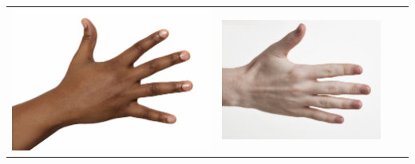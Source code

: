 \begin{longtable}{|N||c|c|c|}
\begin{minipage}{.29\textwidth}
    \includegraphics[width=\textwidth,height=\textheight,keepaspectratio]{../inputs/hand_dark.jpg}
  \end{minipage} & 
  \begin{minipage}{.29\textwidth}
    \includegraphics[width=\textwidth,height=\textheight,keepaspectratio]{../inputs/hand_pale.jpg}
  \end{minipage} & 
  \begin{minipage}{.29\textwidth}

\end{minipage}
\end{longtable}
